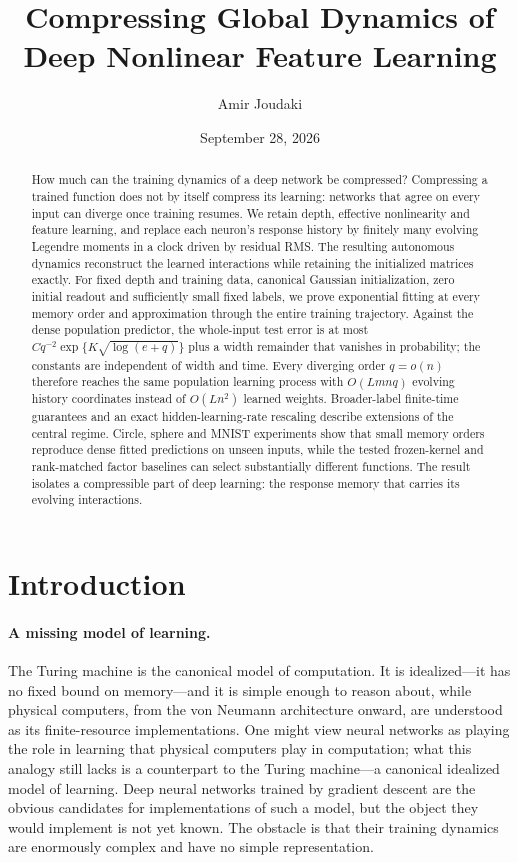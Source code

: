 \documentclass[11pt]{article}
\title{{\fontsize{14}{17}\selectfont\bfseries
Compressing Global Dynamics of Deep Nonlinear Feature Learning}}
\author{Amir Joudaki}
\date{September 28, 2026}
\theoremstyle{definition}
\theoremstyle{remark}
\begin{document}
\maketitle

\begin{abstract}
How much can the training dynamics of a deep network be compressed?
Compressing a trained function does not by itself compress its learning:
networks that agree on every input can diverge once training resumes.
We retain depth, effective nonlinearity and feature learning, and replace
each neuron's response history by finitely many evolving Legendre moments
in a clock driven by residual RMS.  The resulting autonomous dynamics
reconstruct the learned interactions while retaining the initialized
matrices exactly.  For fixed depth and training data, canonical Gaussian
initialization, zero initial readout and sufficiently small fixed labels,
we prove exponential fitting at every memory order and approximation
through the entire training trajectory.  Against the dense population
predictor, the whole-input test error is at most
$Cq^{-2}\exp\{K\sqrt{\log(e+q)}\}$ plus a width remainder that vanishes
in probability; the constants are independent of width and time.
Every diverging order $q=o(n)$ therefore reaches the same population
learning process with $O(Lmnq)$ evolving history coordinates instead of
$O(Ln^2)$ learned weights.  Broader-label finite-time guarantees and an
exact hidden-learning-rate rescaling describe extensions of the central
regime.  Circle, sphere and MNIST experiments show that small memory
orders reproduce dense fitted predictions on unseen inputs, while the
tested frozen-kernel and rank-matched factor baselines can select
substantially different functions.  The result isolates a compressible
part of deep learning: the response memory that carries its evolving
interactions.
\end{abstract}

\section{Introduction}

\paragraph{A missing model of learning.}
The Turing machine is the canonical model of computation.  It is idealized---it
has no fixed bound on memory---and it is simple enough to reason about,
while physical computers, from the von Neumann architecture onward, are
understood as its finite-resource implementations.  One might view neural networks
as playing the role in learning that physical computers play in computation;
what this analogy still lacks is a counterpart to the Turing machine---a
canonical idealized model of learning.  Deep neural networks trained by gradient
descent are the obvious candidates for implementations of such a model, but the
object they would implement is not yet known.  The obstacle is that their
training dynamics are enormously complex and have no simple representation.
\end{document}
